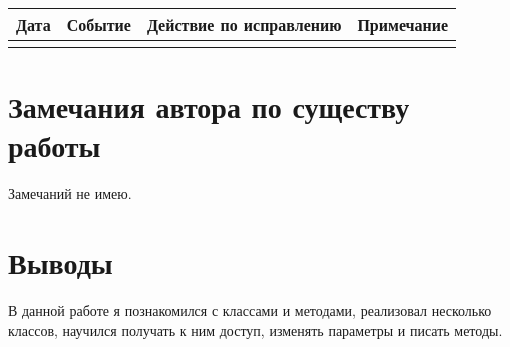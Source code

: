 \documentclass[15pt]{extarticle}
\begin{document}
\begin{tabular}{|c|c|c|c|}
\hline
Дата     & Событие    & Действие по исправлению   & Примечание \\
\hline
& & & \\
\hline
\end{tabular}

\section{Замечания автора по существу работы}
Замечаний не имею.

\section{Выводы}
В данной работе я познакомился с классами и методами, реализовал несколько классов, научился получать к ним доступ, изменять параметры и писать методы.
\end{document}
